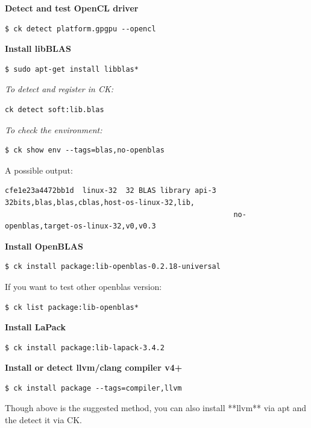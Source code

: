 \documentclass[sigplan]{acmart}
\begin{document}
\textbf{Detect and test OpenCL driver}

\begin{verbatim}
$ ck detect platform.gpgpu --opencl 
\end{verbatim}


\textbf{Install libBLAS}

\begin{verbatim}
$ sudo apt-get install libblas*
\end{verbatim}

\textit{To detect and register in CK:}

\begin{verbatim}
ck detect soft:lib.blas
\end{verbatim}

\textit{To check the environment:}

\begin{verbatim}
$ ck show env --tags=blas,no-openblas
\end{verbatim}

A possible output:

\begin{verbatim}
cfe1e23a4472bb1d  linux-32  32 BLAS library api-3  32bits,blas,blas,cblas,host-os-linux-32,lib,
                                                     no-openblas,target-os-linux-32,v0,v0.3
\end{verbatim}

\textbf{Install OpenBLAS}

\begin{verbatim}
$ ck install package:lib-openblas-0.2.18-universal
\end{verbatim}

If you want to test other openblas version:

\begin{verbatim}
$ ck list package:lib-openblas* 
\end{verbatim}

\textbf{Install LaPack}

\begin{verbatim}
$ ck install package:lib-lapack-3.4.2
\end{verbatim}

\textbf{Install or detect llvm/clang compiler v4+}

\begin{verbatim}
$ ck install package --tags=compiler,llvm
\end{verbatim}

Though above is the suggested method, you can also install **llvm** via apt and the detect it via CK.
\end{document}
